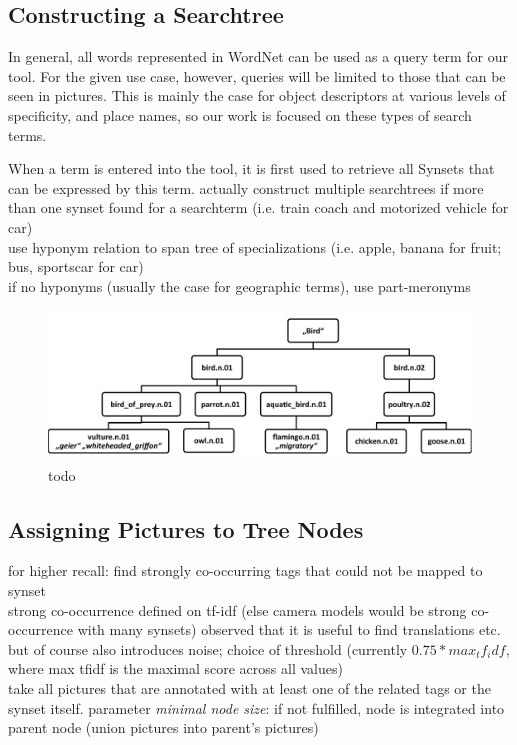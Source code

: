 \subsection{Constructing a Searchtree} 
In general, all words represented in WordNet can be used as a query term for our tool. For the given use case, however, queries will be limited to those that can be seen in pictures. This is mainly the case for object descriptors at various levels of specificity, and place names, so our work is focused on these types of search terms.

When a term is entered into the tool, it is first used to retrieve all Synsets that can be expressed by this term.
actually construct multiple searchtrees if more than one synset found for a searchterm (i.e. train coach and motorized vehicle for car)\\
use hyponym relation to span tree of specializations (i.e. apple, banana for fruit; bus, sportscar for car)\\
if no hyponyms (usually the case for geographic terms), use part-meronyms\\

\begin{figure}
\includegraphics[width=\textwidth]{images/searchtree.pdf}
\caption{todo}
\label{fig_searchtree}
\end{figure}


\subsection{Assigning Pictures to Tree Nodes}
for higher recall: find strongly co-occurring tags that could not be mapped to synset \\
strong co-occurrence defined on tf-idf (else camera models would be strong co-occurrence with many synsets)
observed that it is useful to find translations etc. but of course also introduces noise; choice of threshold (currently $0.75 * max_tf_idf$, where max tfidf is the maximal score across all values) \\
take all pictures that are annotated with at least one of the related tags or the synset itself. parameter \emph{minimal node size}: if not fulfilled, node is integrated into parent node (union pictures into parent's pictures)

